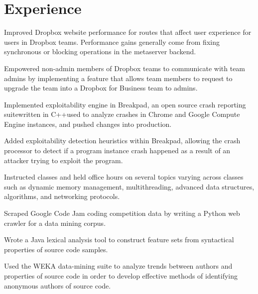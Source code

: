 \documentclass[]{template}
\begin{document}
\section{Experience}

\begin{tightemize}
\item Improved Dropbox website performance for routes that affect user experience for users in Dropbox teams. Performance gains generally come from fixing synchronous or blocking operations in the metaserver backend.
\item Empowered non-admin members of Dropbox teams to communicate with team admins by implementing a feature that allows team members to request to upgrade the team into a Dropbox for Business team to admins.
\end{tightemize}
\sectionsep

\begin{tightemize}
\item Implemented  exploitability  engine  in  Breakpad,  an  open  source  crash  reporting  suitewritten  in  C++used  to  analyze  crashes  in  Chrome  and  Google  Compute  Engine  instances,  and  pushed  changes  into  production.
\item Added exploitability detection heuristics within Breakpad, allowing the crash processor to detect if a program instance crash happened as a result of an attacker trying to exploit the program.
\end{tightemize}
\sectionsep

\begin{tightemize}
\item Instructed classes and held office hours on several topics varying across classes such as dynamic memory management, multithreading, advanced data structures, algorithms, and networking protocols.
\end{tightemize}
\sectionsep

\begin{tightemize}
\item Scraped Google Code Jam coding competition data by writing a Python web crawler for a data mining corpus.
\item Wrote a Java lexical analysis tool to construct feature sets from syntactical properties of source code samples.
\item Used the WEKA data-mining suite to analyze trends between authors and properties of source code in order to develop effective methods of identifying anonymous authors of source code.
\end{tightemize}
\sectionsep
\end{document}
